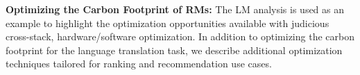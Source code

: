 



\textbf{Optimizing the Carbon Footprint of \mbox{RMs}:}
The LM analysis is used as an example to highlight the optimization opportunities available with judicious cross-stack, hardware/software optimization. In addition to optimizing the carbon footprint for the language translation task,
we describe additional optimization techniques tailored for ranking and recommendation use cases. 



